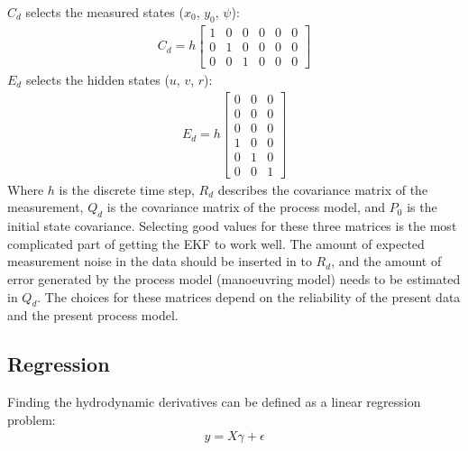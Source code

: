\sphinxAtStartPar
\(C_d\) selects the measured states (\(x_0\), \(y_0\), \(\psi\)):
\begin{equation}\label{equation:04.01_EK:eqcd}
\begin{split}\displaystyle C_{d} = h \left[\begin{matrix}1 & 0 & 0 & 0 & 0 & 0\\0 & 1 & 0 & 0 & 0 & 0\\0 & 0 & 1 & 0 & 0 & 0\end{matrix}\right]\end{split}
\end{equation}
\sphinxAtStartPar
\(E_d\) selects the hidden states (\(u\), \(v\), \(r\)):
\begin{equation}\label{equation:04.01_EK:eqed}
\begin{split}\displaystyle E_{d} = h \left[\begin{matrix}0 & 0 & 0\\0 & 0 & 0\\0 & 0 & 0\\1 & 0 & 0\\0 & 1 & 0\\0 & 0 & 1\end{matrix}\right]\end{split}
\end{equation}
\sphinxAtStartPar
Where \(h\) is the discrete time step, \(R_d\) describes the covariance matrix of the measurement, \(Q_d\) is the covariance matrix of the process model, and \(P_0\) is the initial state covariance.
Selecting good values for these three matrices is the most complicated part of getting the EKF to work well. The amount of expected measurement noise in the data should be inserted in to \(R_d\), and the amount of error generated by the process model (manoeuvring model) needs to be estimated in \(Q_d\). The choices for these matrices depend on the reliability of the present data and the present process model.

\subsection{Regression}
Finding the hydrodynamic derivatives can be defined as a linear regression problem:
\begin{equation}\label{equation:03.01_inverse_dynamics:eqregression}
\begin{split}y = X\gamma + \epsilon\end{split}
\end{equation}

